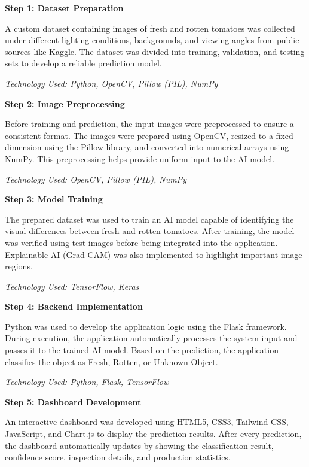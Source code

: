 \textbf{Step 1: Dataset Preparation}

A custom dataset containing images of fresh and rotten tomatoes was collected under different lighting conditions, backgrounds, and viewing angles from public sources like Kaggle. The dataset was divided into training, validation, and testing sets to develop a reliable prediction model.

\textit{Technology Used: Python, OpenCV, Pillow (PIL), NumPy}

\vspace{0.3cm}

\textbf{Step 2: Image Preprocessing}

Before training and prediction, the input images were preprocessed to ensure a consistent format. The images were prepared using OpenCV, resized to a fixed dimension using the Pillow library, and converted into numerical arrays using NumPy. This preprocessing helps provide uniform input to the AI model.

\textit{Technology Used: OpenCV, Pillow (PIL), NumPy}

\vspace{0.3cm}

\textbf{Step 3: Model Training}

The prepared dataset was used to train an AI model capable of identifying the visual differences between fresh and rotten tomatoes. After training, the model was verified using test images before being integrated into the application. Explainable AI (Grad-CAM) was also implemented to highlight important image regions.

\textit{Technology Used: TensorFlow, Keras}

\vspace{0.3cm}

\textbf{Step 4: Backend Implementation}

Python was used to develop the application logic using the Flask framework. During execution, the application automatically processes the system input and passes it to the trained AI model. Based on the prediction, the application classifies the object as Fresh, Rotten, or Unknown Object.

\textit{Technology Used: Python, Flask, TensorFlow}

\vspace{0.3cm}

\textbf{Step 5: Dashboard Development}

An interactive dashboard was developed using HTML5, CSS3, Tailwind CSS, JavaScript, and Chart.js to display the prediction results. After every prediction, the dashboard automatically updates by showing the classification result, confidence score, inspection details, and production statistics.

